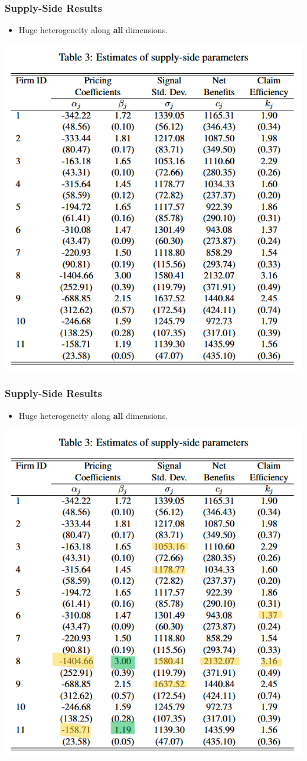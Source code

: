 \documentclass[10pt,aspectratio=169]{beamer}
\begin{document}
\begin{frame}
\frametitle{Supply-Side Results}
    \begin{itemize}
        \item Huge heterogeneity along \textbf{all} dimensions.
    \end{itemize}
     \includegraphics[width=.5\linewidth]{Figures/Tab3.png} 
\end{frame}

\begin{frame}
\frametitle{Supply-Side Results}
    \begin{itemize}
        \item Huge heterogeneity along \textbf{all} dimensions.
    \end{itemize}
     \includegraphics[width=.5\linewidth]{Figures/Tab3_hihglighted.png} 
\end{frame}
\end{document}
